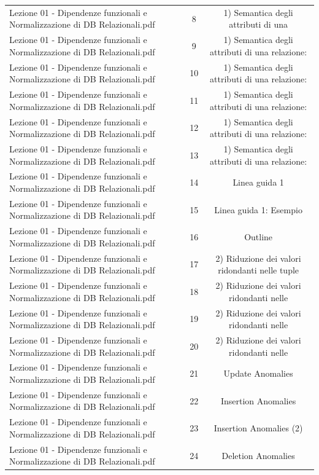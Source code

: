 \documentclass[11pt]{article}
\begin{document}
\begin{longtable}{@{}p{}cc@{}}
Lezione 01 - Dipendenze funzionali e Normalizzazione di DB Relazionali.pdf & 8 & 1) Semantica degli attributi di una \\
Lezione 01 - Dipendenze funzionali e Normalizzazione di DB Relazionali.pdf & 9 & 1) Semantica degli attributi di una relazione: \\
Lezione 01 - Dipendenze funzionali e Normalizzazione di DB Relazionali.pdf & 10 & 1) Semantica degli attributi di una relazione: \\
Lezione 01 - Dipendenze funzionali e Normalizzazione di DB Relazionali.pdf & 11 & 1) Semantica degli attributi di una relazione: \\
Lezione 01 - Dipendenze funzionali e Normalizzazione di DB Relazionali.pdf & 12 & 1) Semantica degli attributi di una relazione: \\
Lezione 01 - Dipendenze funzionali e Normalizzazione di DB Relazionali.pdf & 13 & 1) Semantica degli attributi di una relazione: \\
Lezione 01 - Dipendenze funzionali e Normalizzazione di DB Relazionali.pdf & 14 & Linea guida 1 \\
Lezione 01 - Dipendenze funzionali e Normalizzazione di DB Relazionali.pdf & 15 & Linea guida 1: Esempio \\
Lezione 01 - Dipendenze funzionali e Normalizzazione di DB Relazionali.pdf & 16 & Outline \\
Lezione 01 - Dipendenze funzionali e Normalizzazione di DB Relazionali.pdf & 17 & 2) Riduzione dei valori ridondanti nelle tuple \\
Lezione 01 - Dipendenze funzionali e Normalizzazione di DB Relazionali.pdf & 18 & 2) Riduzione dei valori ridondanti nelle \\
Lezione 01 - Dipendenze funzionali e Normalizzazione di DB Relazionali.pdf & 19 & 2) Riduzione dei valori ridondanti nelle \\
Lezione 01 - Dipendenze funzionali e Normalizzazione di DB Relazionali.pdf & 20 & 2) Riduzione dei valori ridondanti nelle \\
Lezione 01 - Dipendenze funzionali e Normalizzazione di DB Relazionali.pdf & 21 & Update Anomalies \\
Lezione 01 - Dipendenze funzionali e Normalizzazione di DB Relazionali.pdf & 22 & Insertion Anomalies \\
Lezione 01 - Dipendenze funzionali e Normalizzazione di DB Relazionali.pdf & 23 & Insertion Anomalies (2) \\
Lezione 01 - Dipendenze funzionali e Normalizzazione di DB Relazionali.pdf & 24 & Deletion Anomalies \\

\end{longtable}
\end{document}

